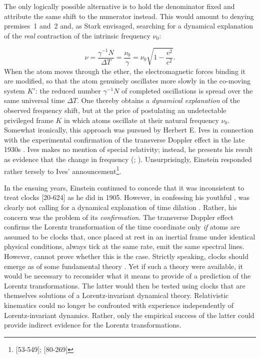 \documentclass[pdflatex]{sn-jnl}
\newcommand{\tDe}{transverse Doppler effect\xspace}
\begin{document}
The only logically possible alternative is to hold the denominator fixed and attribute the same shift to the numerator instead. This would amount to denying premises~1 and~2 and, as Stark envisaged, searching for a dynamical explanation of the \emph{real} contraction of the intrinsic frequency $\nu_0$:

\begin{equation}
\nu = \frac{\gamma^{-1}N}{\Delta T}
= \frac{\nu_0}{\gamma}
= \nu_0 \sqrt{1-\frac{v^2}{c^2}}.
\end{equation}
%
When the atom moves through the ether, the electromagnetic forces binding it are modified, so that the atom genuinely oscillates more slowly in the co-moving system $K'$: the reduced number $\gamma^{-1}N$ of completed oscillations is spread over the same universal time $\Delta T$. One thereby obtains a \emph{dynamical explanation} of the observed frequency shift, but at the price of postulating an undetectable privileged frame $K$ in which atoms oscillate at their natural frequency $\nu_0$. Somewhat ironically, this approach was pursued by Herbert E. Ives \citep{Ives1938} in connection with the experimental confirmation of the \tDe in the late 1930s \citep{Lalli2013}. Ives makes no mention of special relativity; instead, he presents his result as evidence that the change in frequency  (\citealp[225]{Ives1938}; \citealp[see][374]{Ives1941-05}). Unsurprisingly, Einstein responded rather tersely to Ives’ announcement\footnote{[53-549]; [80-269]}.

In the ensuing years, Einstein continued to concede that it was inconsistent to treat clocks  [20-624] as he did in 1905. However, in confessing his youthful , \citet[61]{Einstein1949} was clearly not calling for a dynamical explanation of time dilation \ala \citet{Ives1947}. Rather, his concern was the problem of its \emph{confirmation}. The \tDe confirms the Lorentz transformation of the time coordinate only \emph{if} atoms are assumed to be  clocks that, once placed at rest in an inertial frame under identical physical conditions, always tick at the same rate, \ie emit the same spectral lines. However, \sr cannot prove whether this is the case. Strictly speaking, clocks should emerge as  of some fundamental theory \citep[59]{Einstein1949}. Yet if such a theory were available, it would be necessary to reconsider what it means to provide  of a prediction of the Lorentz transformations. The latter would then be tested using clocks that are themselves solutions of a Lorentz-invariant dynamical theory. Relativistic kinematics could no longer be confronted with experience independently of Lorentz-invariant dynamics. Rather, only the empirical success of the latter could provide indirect evidence for the Lorentz transformations.
\end{document}
